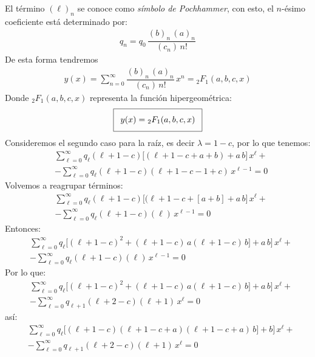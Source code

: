 El término $(\ell)_{n}$ se conoce como \emph{símbolo de Pochhammer}, con esto, el $n$-ésimo coeficiente está determinado por:
\begin{align*}
q_{n} =  q_{0} \, \dfrac{(b)_{n} \, (a)_{n}}{(c_{n}) \, n!}
\end{align*}
De esta forma tendremos
\begin{align*}
y(x) = \sum_{n=0}^{\infty} \dfrac{(b)_{n} \, (a)_{n}}{(c_{n}) \, n!} \, x^{n} = {}_{2}F_{1} (a, b, c, x)
\end{align*}
Donde ${}_{2}F_{1} (a, b, c, x)$ representa la función hipergeométrica:
\begin{align*}
\addtolength{\fboxsep}{5pt}\boxed{
y(x) = {}_{2}F_{1} (a, b, c, x) }
\end{align*}
Consideremos el segundo caso para la raíz, es decir $\lambda = 1 - c$, por lo que tenemos:
\begin{align*}
&\sum_{\ell=0}^{\infty} q_{\ell} (\ell + 1 - c)\big[ (\ell + 1 - c + a + b ) + a \, b \big] \, x^{\ell} + \\[0.5em]
&- \sum_{\ell=0}^{\infty} q_{\ell} (\ell + 1 - c) (\ell + 1 - c - 1 + c) \, x^{\ell-1} = 0
\end{align*}
Volvemos a reagrupar términos:
\begin{align*}
&\sum_{\ell=0}^{\infty} q_{\ell} (\ell + 1 - c) \big[ (\ell + 1 - c + [ a + b] + a \, b \big] \, x^{\ell} + \\[0.5em]
&- \sum_{\ell=0}^{\infty} q_{\ell} (\ell + 1 - c) (\ell) \, x^{\ell-1} = 0
\end{align*}
Entonces:
\begin{align*}
&\sum_{\ell=0}^{\infty} q_{\ell} \bigg[ (\ell + 1 - c)^{2} + (\ell + 1 - c) \, a (\ell + 1 - c) \, b] + a \, b \bigg] \, x^{\ell} + \\[0.5em]
&- \sum_{\ell=0}^{\infty} q_{\ell} (\ell + 1 - c) (\ell) \, x^{\ell-1} = 0
\end{align*}
Por lo que:
\begin{align*}
&\sum_{\ell=0}^{\infty} q_{\ell} \bigg[ (\ell + 1 - c)^{2} + (\ell + 1 - c) \, a (\ell + 1 - c) \, b] + a \, b \bigg] \, x^{\ell} + \\[0.5em]
&- \sum_{\ell=0}^{\infty} q_{\ell+1} (\ell + 2 - c) (\ell + 1) \, x^{\ell} = 0
\end{align*}
así:
\begin{align*}
&\sum_{\ell=0}^{\infty} q_{\ell} \bigg[ (\ell + 1 - c) (\ell + 1 - c + a) (\ell + 1 - c +  a) \, b] + b \bigg] \, x^{\ell} + \\[0.5em]
&- \sum_{\ell=0}^{\infty} q_{\ell+1} (\ell + 2 - c) (\ell + 1) \, x^{\ell} = 0
\end{align*}
